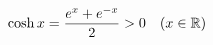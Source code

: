 \documentclass[preview]{standalone}
\begin{document}
\begin{align*}
\special{dvisvgm:raw <g id='unique000'>}\cosh x=\frac{e^x+e^{-x}}{2}>0\quad(x\in\mathbb{R})\special{dvisvgm:raw </g>}
\end{align*}
\end{document}
